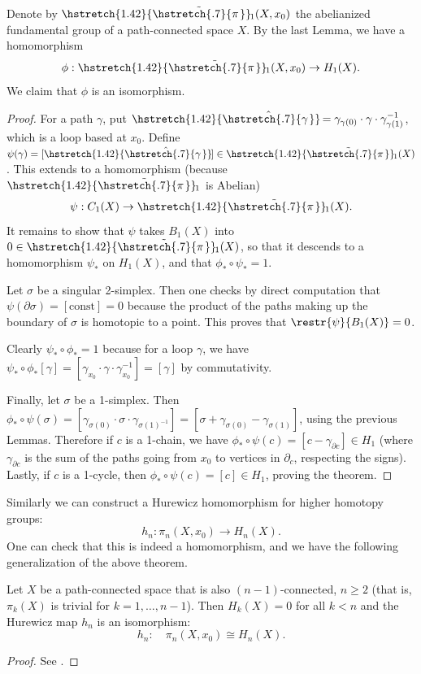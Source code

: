 \documentclass[english,letterpaper]{article}%
\numberwithin{equation}{section}
\numberwithin{figure}{section}
\numberwithin{table}{section}
\theoremstyle{definition}
\theoremstyle{definition}
\theoremstyle{definition}
\theoremstyle{plain}
\theoremstyle{plain}
\theoremstyle{plain}
\theoremstyle{plain}
\theoremstyle{remark}
\theoremstyle{remark}
\renewcommand{\geq}{\geqslant}
\newcommand\wh[1]{\hstretch{1.42}{\hat{\hstretch{.7}{#1\mkern2mu}}}\mkern-2mu} %
\newcommand\wt[1]{\hstretch{1.42}{\tilde{\hstretch{.7}{#1\mkern2mu}}}\mkern-2mu}
\begin{document}
\begin{thm}[Hurewicz]
    Denote by $\wt{\pi}_1(X,x_0)$ the abelianized fundamental group of a path-connected space $X$. By the last Lemma, we have a homomorphism
    \[\phi: \wt{\pi}_1(X,x_0)\to H_1(X).\]
    We claim that $\phi $ is an isomorphism.
\end{thm}
\begin{proof}
     For a path $\gamma$, put $\wh{\gamma}=\gamma_{\gamma(0)}\cdot \gamma \cdot \gamma_{\gamma(1)}^{-1}$, which is a loop based at $x_0$. Define $\psi(\gamma)=[\wh{\gamma}]\in \wt{\pi}_1(X)$. This extends to a homomorphism (because $\wt{\pi}_1$ is Abelian)
     \[\psi:C_1(X)\to \wt{\pi}_1(X).\]
     It remains to show that $\psi$ takes $B_1(X)$ into $0\in\wt{\pi}_1(X)$, so that it descends to a homomorphism $\psi_\ast$ on $H_1(X)$, and that $\phi_\ast\circ\psi_\ast=1$.
     
     Let $\sigma$ be a singular 2-simplex. Then one checks by direct computation that $\psi(\partial\sigma)=[\text{const}]=0$ because the product of the paths making up the boundary of $\sigma$ is homotopic to a point. This proves that $\restr{\psi}{B_1(X)}=0$.
     
     Clearly $\psi_\ast \circ \phi_\ast=1$ because for a loop $\gamma$, we have $\psi_\ast \circ \phi_\ast[\gamma]=[\gamma_{x_0}\cdot \gamma\cdot \gamma_{x_0}^{-1}]=[\gamma]$ by commutativity.
     
     Finally, let $\sigma$ be a 1-simplex. Then $\phi_\ast \circ \psi(\sigma)=[\gamma_{\sigma(0)}\cdot \sigma\cdot \gamma_{\sigma(1)^{-1}}]=[\sigma+\gamma_{\sigma(0)}-\gamma_{\sigma(1)}]$, using the previous Lemmas. Therefore if $c$ is a 1-chain, we have $\phi_\ast\circ \psi(c)=[c-\gamma_{\partial c}]\in H_1$ (where $\gamma_{\partial c}$ is the sum of the paths going from $x_0$ to vertices in $\partial_c$, respecting the signs). Lastly, if $c$ is a 1-cycle, then $\phi_\ast \circ\psi(c)=[c]\in H_1$, proving the theorem.
\end{proof}

Similarly we can construct a Hurewicz homomorphism for higher homotopy groups:
\[h_n:\pi_n(X,x_0)\to H_n(X).\]
One can check that this is indeed a homomorphism, and we have the following generalization of the above theorem.

\begin{thm}[Hurewicz]
    Let $X$ be a path-connected space that is also $(n-1)$-connected, $n\geq 2$ (that is, $\pi_k(X)$ is trivial for $k=1,\ldots,n-1$). Then $H_k(X)=0$ for all $k<n$ and the Hurewicz map $h_n$ is an isomorphism:
    \[h_n:\quad \pi_n(X,x_0)\cong H_n(X).\]
\end{thm}
\begin{proof}
     See \cite[Thm.\ VII.10.7]{Bredon}.
\end{proof}
\end{document}
